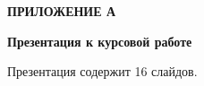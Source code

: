 \begin{center}
    \textbf{ПРИЛОЖЕНИЕ А}
\end{center}

\begin{center}
    \textbf{Презентация к курсовой работе}
\end{center}

Презентация содержит 16 слайдов.
